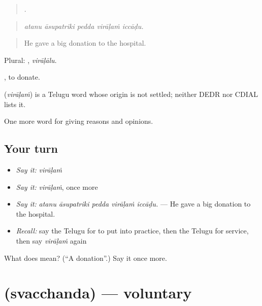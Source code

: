 \begin{quote}
    .
\end{quote}

\begin{quote}
\emph{atanu āsupatriki pedda virāḷaṁ iccāḍu.}
\end{quote}

\begin{quote}
He gave a big donation to the hospital.
\end{quote}

Plural: , \emph{virāḷālu}.

 , to donate.

\begin{cousinweb}
\textbf{} (\emph{virāḷaṁ}) is a Telugu word whose origin is not settled; neither DEDR nor CDIAL lists it.
\end{cousinweb}

\begin{grammarlens}[title={What you've built}]
One more word for giving reasons and opinions.
\end{grammarlens}

\subsection*{Your turn}
\begin{itemize}
\raggedright
  \item \emph{Say it:} \emph{virāḷaṁ}
  \item \emph{Say it:} \emph{virāḷaṁ}, once more
  \item \emph{Say it:} \emph{atanu āsupatriki pedda virāḷaṁ iccāḍu.} — He gave a big donation to the hospital.
  \item \emph{Recall:} say the Telugu for to put into practice, then the Telugu for service, then say \emph{virāḷaṁ} again
\end{itemize}

\begin{tcolorbox}[breakable,colback=teal!4,colframe=teal!35!black,title={Before you move on}]
What does  mean? (\textquotedblleft{}A donation\textquotedblright{}.) Say it once more.
\end{tcolorbox}
\section[\texorpdfstring{\te{స్వచ్ఛంద} (svacchanda)}{స్వచ్ఛంద (svacchanda)}]{ (svacchanda) — voluntary}

